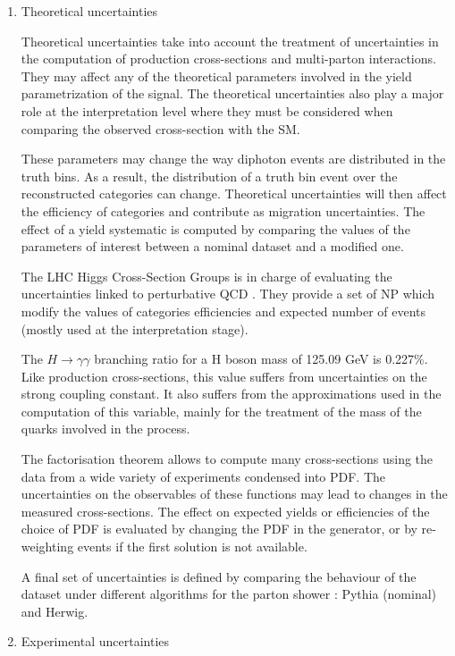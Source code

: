 \begin{enumerate}
\item Theoretical uncertainties
  \label{sec:orgdba6640}

Theoretical uncertainties take into account the treatment of uncertainties in the computation of production cross-sections and multi-parton interactions.
They may affect any of the theoretical parameters involved in the yield parametrization of the signal.
The theoretical uncertainties also play a major role at the interpretation level where they must be considered when comparing the observed cross-section with the SM.

These parameters may change the way diphoton events are distributed in the truth bins.
As a result, the distribution of a truth bin event over the reconstructed categories can change.
Theoretical uncertainties will then affect the efficiency of categories and contribute as migration uncertainties.
The effect of a yield systematic is computed by comparing the values of the parameters of interest between a nominal dataset and a modified one.

The LHC Higgs Cross-Section Groups is in charge of evaluating the uncertainties linked to perturbative QCD \cite{deFlorian:2227475}.
They provide a set of NP which modify the values of categories efficiencies and expected number of events (mostly used at the interpretation stage).

The $H\rightarrow \gamma\gamma$ branching ratio for a H boson mass of 125.09 GeV \cite{CERN-PH-EP-2015-075} is 0.227\%.
Like production cross-sections, this value suffers from uncertainties on the strong coupling constant.
It also suffers from the approximations used in the computation of this variable, mainly for the treatment of the mass of the quarks involved in the process.

The factorisation theorem allows to compute many cross-sections using the data from a wide variety of experiments condensed into PDF.
The uncertainties on the observables of these functions may lead to changes in the measured cross-sections.
The effect on expected yields or efficiencies of the choice of PDF is evaluated by changing the PDF in the generator, or by re-weighting events if the first solution is not available.

A final set of uncertainties is defined by comparing the behaviour of the dataset under different algorithms for the parton shower : Pythia (nominal) and Herwig.

\item Experimental uncertainties
\label{sec:org4576e4b}


\end{enumerate}
